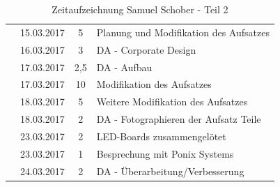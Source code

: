 \documentclass[12pt]{article}
\begin{document}
\begin{table}[hp]
\begin{tabular}{|l|r|c|l|}
                                                                                                         & 15.03.2017                          & 5                                          & Planung und Modifikation des Aufsatzes \\ \cline{2-4} 
                                                                                                         & 16.03.2017                          & 3                                          & DA - Corporate Design                  \\ \cline{2-4} 
                                                                                                         & 17.03.2017                          & 2,5                                        & DA - Aufbau                            \\ \cline{2-4} 
                                                                                                         & 17.03.2017                          & 10                                         & Modifikation des Aufsatzes             \\ \cline{2-4} 
                                                                                                         & 18.03.2017                          & 5                                          & Weitere Modifikation des Aufsatzes     \\ \cline{2-4} 
                                                                                                         & 18.03.2017                          & 2                                          & DA - Fotographieren der Aufsatz Teile  \\ \cline{2-4} 
                                                                                                         & 23.03.2017                          & 2                                          & LED-Boards zusammengelötet             \\ \cline{2-4} 
                                                                                                         & 23.03.2017                          & 1                                          & Besprechung mit Ponix Systems          \\ \cline{2-4} 
                                                                                                         & 24.03.2017                          & 2                                          & DA - Überarbeitung/Verbesserung        \\ \hline
\end{tabular}
\caption{Zeitaufzeichnung Samuel Schober - Teil 2}
\end{table}
\end{document}
